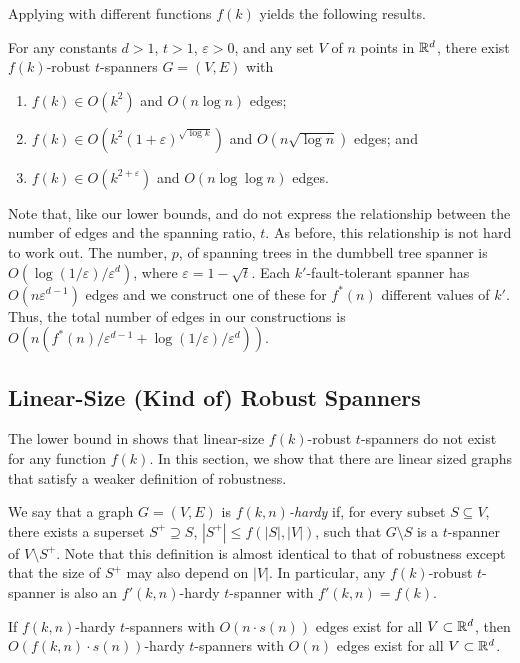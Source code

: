 \documentclass{patmorin}
\newcommand{\eps}{\varepsilon}
\begin{document}
Applying  with different functions $f(k)$ yields the
following results.
\begin{cor}
  For any constants $d >1$, $t>1$, $\eps>0$, and any set $V$ of $n$ points
  in $\mathbb{R}^d$, there exist $f(k)$-robust $t$-spanners $G=(V,E)$ with
  \begin{enumerate}
    \item $f(k)\in O(k^2)$ and $O(n\log n)$ edges;
    \item $f(k)\in O(k^2(1+\eps)^{\sqrt{\log k}})$ and $O(n\sqrt{\log n})$
      edges; and
    \item $f(k)\in O(k^{2+\eps})$ and $O(n\log\log n)$ edges.
  \end{enumerate}
\end{cor}

\begin{rem}
  Note that, like our lower bounds,  and  do
  not express the relationship between the number of edges and the
  spanning ratio, $t$.  As before, this relationship is not hard
  to work out. The number, $p$, of spanning trees in the dumbbell
  tree spanner is $O(\log(1/\eps)/\eps^d)$, where $\eps=1-\sqrt{t}$.
  Each $k'$-fault-tolerant spanner has $O(n\eps^{d-1})$ edges \cite{l99}
  and we construct one of these for $f^*(n)$ different values of $k'$.
  Thus, the total number of edges in our constructions is
  $O(n(f^*(n)/\eps^{d-1} + \log(1/\eps)/\eps^d))$.
\end{rem}


\subsection{Linear-Size (Kind of) Robust Spanners}

The lower bound in  shows that linear-size
$f(k)$-robust $t$-spanners do not exist for any function $f(k)$.  In this
section, we show that there are linear sized graphs that satisfy a weaker
definition of robustness.

We say that a graph $G=(V,E)$ is \emph{$f(k,n)$-hardy} if, for every
subset $S\subseteq V$, there exists a superset $S^+\supseteq S$,
$|S^+|\le f(|S|,|V|)$, such that $G\setminus S$ is a $t$-spanner of
$V\setminus S^+$.  Note that this definition is almost identical to that
of robustness except that the size of $S^+$ may also depend on $|V|$.  In particular, any $f(k)$-robust $t$-spanner is also an $f'(k,n)$-hardy $t$-spanner with $f'(k,n)=f(k)$.

\begin{thm}
  If $f(k,n)$-hardy $t$-spanners with $O(n\cdot s(n))$ edges exist for
  all $V\subset\mathbb{R}^d$, then $O(f(k,n)\cdot s(n))$-hardy $t$-spanners with
  $O(n)$ edges exist for all $V\subset\mathbb{R}^d$.
\end{thm}
\end{document}
